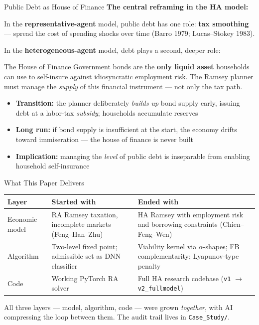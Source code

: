 \documentclass[10pt,aspectratio=169]{beamer}
\newcommand{\compacttables}{\renewcommand{\arraystretch}{1.15}}
\begin{document}
\begin{frame}{Public Debt as House of Finance}
\textbf{The central reframing in the HA model:}

\medskip
In the \textbf{representative-agent} model, public debt has one role: \textbf{tax smoothing}
--- spread the cost of spending shocks over time (Barro 1979; Lucas--Stokey 1983).

\medskip
In the \textbf{heterogeneous-agent} model, debt plays a second, deeper role:

\medskip
\begin{block}{The House of Finance}
Government bonds are the \textbf{only liquid asset} households can use to self-insure against
idiosyncratic employment risk. The Ramsey planner must manage the \emph{supply} of this
financial instrument --- not only the tax path.
\end{block}

\medskip
\begin{itemize}
  \item \textbf{Transition:} the planner deliberately \emph{builds up} bond supply early,
        issuing debt at a labor-tax \emph{subsidy}; households accumulate reserves
  \item \textbf{Long run:} if bond supply is insufficient at the start,
        the economy drifts toward immiseration --- the house of finance is never built
  \item \textbf{Implication:} managing the \emph{level} of public debt is inseparable from
        enabling household self-insurance
\end{itemize}
\end{frame}

\begin{frame}{What This Paper Delivers}
\compacttables
\begin{center}\footnotesize
\begin{tabular}{p{3.4cm}p{4.2cm}p{4.8cm}}
\toprule
\textbf{Layer} & \textbf{Started with} & \textbf{Ended with} \\
\midrule
Economic model & RA Ramsey taxation, incomplete markets (Feng--Han--Zhu) & HA Ramsey with employment risk and borrowing constraints (Chien--Feng--Wen) \\
Algorithm & Two-level fixed point; admissible set as DNN classifier & Viability kernel via $\alpha$-shapes; FB complementarity; Lyapunov-type penalty \\
Code & Working PyTorch RA solver & Full HA research codebase (\texttt{v1} $\to$ \texttt{v2\_fullmodel}) \\
\bottomrule
\end{tabular}
\end{center}

\smallskip
\begin{block}{}
All three layers --- model, algorithm, code --- were grown \emph{together}, with AI compressing
the loop between them. The audit trail lives in \texttt{Case\_Study/}.
\end{block}
\end{frame}
\end{document}
